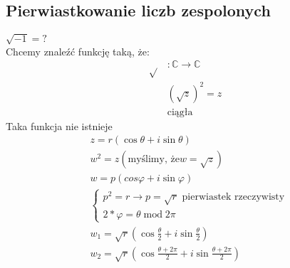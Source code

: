 \documentclass[10pt]{article}
\theoremstyle{definition}
\theoremstyle{definition}
\theoremstyle{definition}
\theoremstyle{definition}
\theoremstyle{remark}
\theoremstyle{definition}
\theoremstyle{definition}
\theoremstyle{definition}
\theoremstyle{definition}
\theoremstyle{definition}
\begin{document}
\subsection{Pierwiastkowanie liczb zespolonych}
$\sqrt{-1} = ?$ \\ 
Chcemy znaleźć funkcję taką, że: 
\begin{align*}
    \sqrt{} &: \mathbb{C} \to \mathbb{C}  \\ 
        &(\sqrt{z})^2 = z  \\ 
        & \text{ciągła} 
\end{align*}
Taka funkcja nie istnieje 
\begin{align*}
    &z = r(\cos\theta + i\sin\theta) \\
    &w^2 = z (\text{myślimy, że} w = \sqrt{z}) \\
    &w = p(cos\varphi + i\sin\varphi) \\
  &\begin{cases} 
        p^2 = r \to p = \sqrt{r} \text{ pierwiastek rzeczywisty} \\
        2*\varphi = \theta \operatorname{mod} 2\pi
    \end{cases}  \\
    &w_1 = \sqrt{r} (\cos\frac{\theta}{2} + i\sin\frac{\theta}{2}) \\ 
    &w_2= \sqrt{r}(\cos\frac{\theta + 2\pi}{2} + i\sin\frac{\theta+2\pi}{2}) \end{align*}
\end{document}
